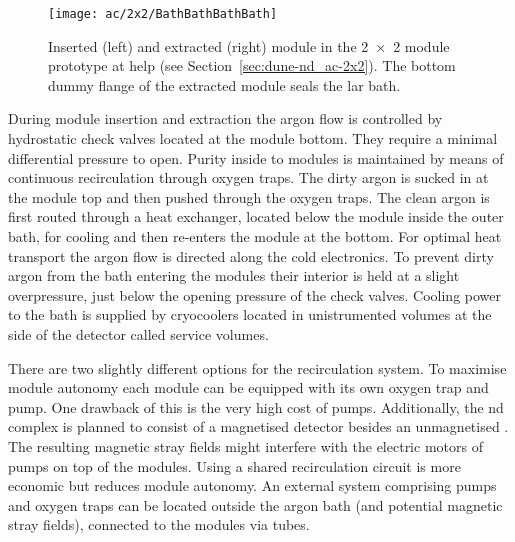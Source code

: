 \begin{figure}[htb]
	\centering
	\texttt{[image: ac/2x2/BathBathBathBath]}
	\caption[\AC{} module insertion and extraction]{%
		Inserted (left) and extracted (right) \AC{} module in the \num{2 x 2} module prototype at \acrshort{help} (see Section~\ref{sec:dune-nd_ac-2x2}).
		The bottom dummy flange of the extracted module seals the \acrshort{lar} bath.
	}
	\label{fig:ac_module-ins-ext}
\end{figure}

During module insertion and extraction the argon flow is controlled by hydrostatic check valves located at the module bottom.
They require a minimal differential pressure to open.
Purity inside to modules is maintained by means of continuous \lar{} recirculation through oxygen traps.
The dirty argon is sucked in at the module top and then pushed through the oxygen traps.
The clean argon is first routed through a heat exchanger, located below the module inside the outer bath, for cooling and then re-enters the module at the bottom.
For optimal heat transport the argon flow is directed along the cold electronics.
To prevent dirty argon from the bath entering the modules their interior is held at a slight overpressure, just below the opening pressure of the check valves.
Cooling power to the bath is supplied by cryocoolers located in unistrumented volumes at the side of the detector called service volumes.

There are two slightly different options for the recirculation system.
To maximise module autonomy each module can be equipped with its own oxygen trap and \lar{} pump.
One drawback of this is the very high cost of \lar{} pumps.
Additionally, the \dune{} \gls{nd} complex is planned to consist of a magnetised detector besides an unmagnetised \lartpc{}.
The resulting magnetic stray fields might interfere with the electric motors of \lar{} pumps on top of the modules.
Using a shared recirculation circuit is more economic but reduces module autonomy.
An external system comprising pumps and oxygen traps can be located outside the argon bath (and potential magnetic stray fields), connected to the modules via tubes.

